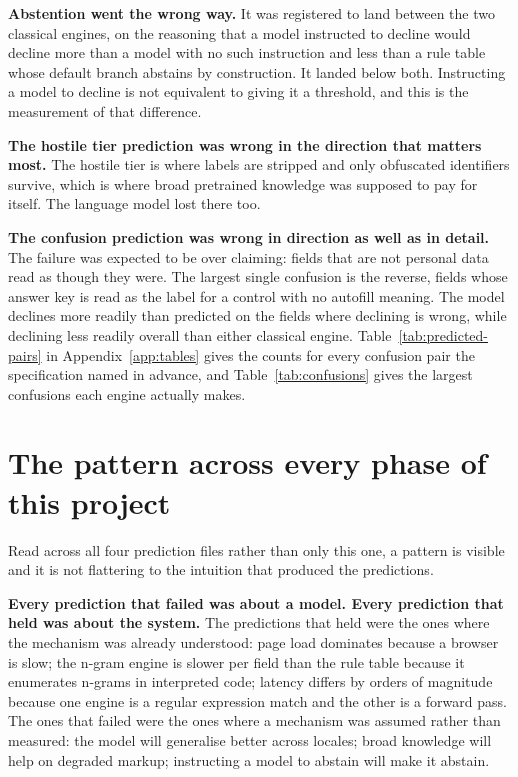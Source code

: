 \textbf{Abstention went the wrong way.} It was registered to land between the two
classical engines, on the reasoning that a model instructed to decline would
decline more than a model with no such instruction and less than a rule table
whose default branch abstains by construction. It landed below both. Instructing
a model to decline is not equivalent to giving it a threshold, and this is the
measurement of that difference.

\textbf{The hostile tier prediction was wrong in the direction that matters
most.} The hostile tier is where labels are stripped and only obfuscated
identifiers survive, which is where broad pretrained knowledge was supposed to
pay for itself. The language model lost there too.

\textbf{The confusion prediction was wrong in direction as well as in detail.}
The failure was expected to be over claiming: fields that are not personal data
read as though they were. The largest single confusion is the reverse, fields
whose answer key is  read as the label for a control with no
autofill meaning. The model declines more readily than predicted on the fields
where declining is wrong, while declining less readily overall than either
classical engine. Table~\ref{tab:predicted-pairs} in Appendix~\ref{app:tables}
gives the counts for every confusion pair the specification named in advance, and
Table~\ref{tab:confusions} gives the largest confusions each engine actually
makes.

\section{The pattern across every phase of this project}

Read across all four prediction files rather than only this one, a pattern is
visible and it is not flattering to the intuition that produced the predictions.

\textbf{Every prediction that failed was about a model. Every prediction that
held was about the system.} The predictions that held were the ones where the
mechanism was already understood: page load dominates because a browser is slow;
the n-gram engine is slower per field than the rule table because it enumerates
n-grams in interpreted code; latency differs by orders of magnitude because one
engine is a regular expression match and the other is a forward pass. The ones
that failed were the ones where a mechanism was assumed rather than measured: the
model will generalise better across locales; broad knowledge will help on
degraded markup; instructing a model to abstain will make it abstain.

